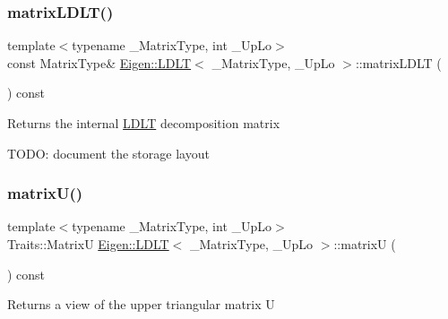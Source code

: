 \subsubsection{\texorpdfstring{matrixLDLT()}{matrixLDLT()}}
{\footnotesize\ttfamily template$<$typename \+\_\+\+Matrix\+Type, int \+\_\+\+Up\+Lo$>$ \\
const Matrix\+Type\& \mbox{\hyperlink{class_eigen_1_1_l_d_l_t}{Eigen\+::\+L\+D\+LT}}$<$ \+\_\+\+Matrix\+Type, \+\_\+\+Up\+Lo $>$\+::matrix\+L\+D\+LT (\begin{DoxyParamCaption}{ }\end{DoxyParamCaption}) const\hspace{0.3cm}{\ttfamily [inline]}}

\begin{DoxyReturn}{Returns}
the internal \mbox{\hyperlink{class_eigen_1_1_l_d_l_t}{L\+D\+LT}} decomposition matrix
\end{DoxyReturn}
T\+O\+DO\+: document the storage layout \mbox{\label{class_eigen_1_1_l_d_l_t_a54838a2e31e53bbe4dcb78b5e80c8484}} 
\subsubsection{\texorpdfstring{matrixU()}{matrixU()}}
{\footnotesize\ttfamily template$<$typename \+\_\+\+Matrix\+Type, int \+\_\+\+Up\+Lo$>$ \\
Traits\+::\+MatrixU \mbox{\hyperlink{class_eigen_1_1_l_d_l_t}{Eigen\+::\+L\+D\+LT}}$<$ \+\_\+\+Matrix\+Type, \+\_\+\+Up\+Lo $>$\+::matrixU (\begin{DoxyParamCaption}{ }\end{DoxyParamCaption}) const\hspace{0.3cm}{\ttfamily [inline]}}

\begin{DoxyReturn}{Returns}
a view of the upper triangular matrix U 
\end{DoxyReturn}
\mbox{\label{class_eigen_1_1_l_d_l_t_a858dc77b65dd48248299bb6a6a758abf}} 
